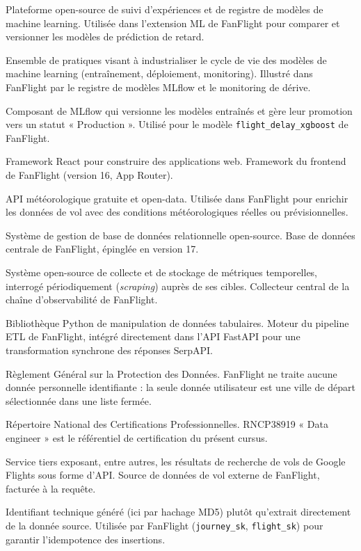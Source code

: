 \documentclass[11pt,a4paper]{report}
\newcommand{\code}[1]{\lstinline{#1}}
\begin{document}
\begin{description}[leftmargin=0cm, style=nextline]
\item[MLflow] Plateforme open-source de suivi d'expériences et de registre de modèles de machine learning. Utilisée dans l'extension ML de FanFlight pour comparer et versionner les modèles de prédiction de retard.
\item[MLOps] Ensemble de pratiques visant à industrialiser le cycle de vie des modèles de machine learning (entraînement, déploiement, monitoring). Illustré dans FanFlight par le registre de modèles MLflow et le monitoring de dérive.
\item[Model Registry] Composant de MLflow qui versionne les modèles entraînés et gère leur promotion vers un statut « Production ». Utilisé pour le modèle \code{flight_delay_xgboost} de FanFlight.
\item[Next.js] Framework React pour construire des applications web. Framework du frontend de FanFlight (version 16, App Router).
\item[Open-Meteo] API météorologique gratuite et open-data. Utilisée dans FanFlight pour enrichir les données de vol avec des conditions météorologiques réelles ou prévisionnelles.
\item[PostgreSQL] Système de gestion de base de données relationnelle open-source. Base de données centrale de FanFlight, épinglée en version 17.
\item[Prometheus] Système open-source de collecte et de stockage de métriques temporelles, interrogé périodiquement (\emph{scraping}) auprès de ses cibles. Collecteur central de la chaîne d'observabilité de FanFlight.
\item[Pandas] Bibliothèque Python de manipulation de données tabulaires. Moteur du pipeline ETL de FanFlight, intégré directement dans l'API FastAPI pour une transformation synchrone des réponses SerpAPI.
\item[RGPD] Règlement Général sur la Protection des Données. FanFlight ne traite aucune donnée personnelle identifiante : la seule donnée utilisateur est une ville de départ sélectionnée dans une liste fermée.
\item[RNCP] Répertoire National des Certifications Professionnelles. RNCP38919 « Data engineer » est le référentiel de certification du présent cursus.
\item[SerpAPI] Service tiers exposant, entre autres, les résultats de recherche de vols de Google Flights sous forme d'API. Source de données de vol externe de FanFlight, facturée à la requête.
\item[Surrogate key (clé de substitution)] Identifiant technique généré (ici par hachage MD5) plutôt qu'extrait directement de la donnée source. Utilisée par FanFlight (\code{journey_sk}, \code{flight_sk}) pour garantir l'idempotence des insertions.

\end{description}
\end{document}
